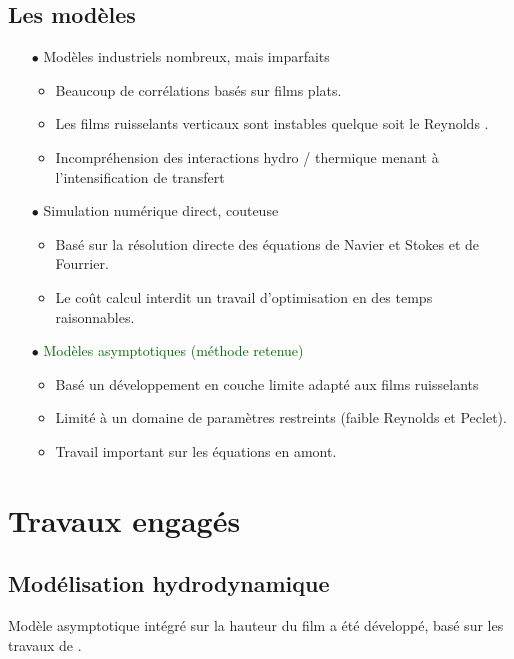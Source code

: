\documentclass[a0,portrait,11pt]{a0poster}
\begin{document}
\begin{multicols}{2}
\subsection*{Les modèles}
\begin{itemize}
	\item[$\bullet$] Modèles industriels nombreux, mais imparfaits \cite{Killion2001}
	\begin{itemize}
		\item Beaucoup de corrélations basés sur films plats.
		\color{DarkRed} \item Les films ruisselants verticaux sont instables quelque soit le Reynolds \textcite{Miller1998a}.
		\item Incompréhension des interactions hydro / thermique menant à l'intensification de transfert
	\end{itemize}
	\item[$\bullet$] Simulation numérique direct, couteuse
	\begin{itemize}
		\item Basé sur la résolution directe des équations de Navier et Stokes et de Fourrier.
		\color{DarkRed} \item Le coût calcul interdit un travail d'optimisation en des temps raisonnables.
	\end{itemize}
	\item[$\bullet$] \textcolor{DarkGreen}{Modèles asymptotiques (méthode retenue)}
	\begin{itemize}
		\item Basé un développement en couche limite adapté aux films ruisselants
		\color{DarkRed} \item Limité à un domaine de paramètres restreints (faible Reynolds et Peclet).
		\color{DarkRed} \item Travail important sur les équations en amont.
	\end{itemize}
\end{itemize}

\columnbreak

\section*{Travaux engagés}
\subsection*{Modélisation hydrodynamique}
Modèle asymptotique intégré sur la hauteur du film a été développé, basé sur les travaux de \textcite{Ruyer-Quil2000}.


\end{multicols}
\end{document}
